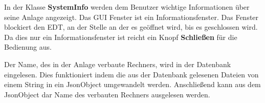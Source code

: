 In der Klasse \textbf{SystemInfo} werden dem Benutzer wichtige Informationen über seine Anlage angezeigt. Das \ac{GUI} Fenster ist ein Informationsfenster. Das Fenster blockiert den \ac{EDT}, an der Stelle an der es geöffnet wird, bis es geschlossen wird. Da dies nur ein Informationsfenster ist reicht ein Knopf \textbf{Schließen} für die Bedienung aus.

\vspace{10pt}

\vspace{10pt}

Der Name, des in der Anlage verbaute Rechners, wird in der Datenbank eingelesen. Dies funktioniert indem die aus der Datenbank gelesenen Dateien von einem String in ein JsonObject umgewandelt werden. Anschließend kann aus dem JsonObject dar Name des verbauten Rechners ausgelesen werden.

\vspace{50pt}

